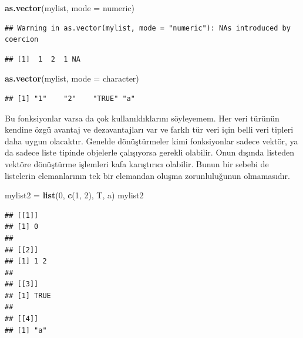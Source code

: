 \documentclass[
]{book}
\newenvironment{Shaded}{\begin{snugshade}}{\end{snugshade}}
\newcommand{\DataTypeTok}[1]{\textcolor[rgb]{0.13,0.29,0.53}{#1}}
\newcommand{\DecValTok}[1]{\textcolor[rgb]{0.00,0.00,0.81}{#1}}
\newcommand{\KeywordTok}[1]{\textcolor[rgb]{0.13,0.29,0.53}{\textbf{#1}}}
\newcommand{\NormalTok}[1]{#1}
\newcommand{\StringTok}[1]{\textcolor[rgb]{0.31,0.60,0.02}{#1}}
\begin{document}
\begin{Shaded}
\begin{Highlighting}[]
\KeywordTok{as.vector}\NormalTok{(mylist, }\DataTypeTok{mode =} \StringTok{\textquotesingle{}numeric\textquotesingle{}}\NormalTok{)}
\end{Highlighting}
\end{Shaded}

\begin{verbatim}
## Warning in as.vector(mylist, mode = "numeric"): NAs introduced by coercion
\end{verbatim}

\begin{verbatim}
## [1]  1  2  1 NA
\end{verbatim}

\begin{Shaded}
\begin{Highlighting}[]
\KeywordTok{as.vector}\NormalTok{(mylist, }\DataTypeTok{mode =} \StringTok{\textquotesingle{}character\textquotesingle{}}\NormalTok{)}
\end{Highlighting}
\end{Shaded}

\begin{verbatim}
## [1] "1"    "2"    "TRUE" "a"
\end{verbatim}

Bu fonksiyonlar varsa da çok kullanıldıklarını söyleyemem. Her veri türünün kendine özgü avantaj ve dezavantajları var ve farklı tür veri için belli veri tipleri daha uygun olacaktır. Genelde dönüştürmeler kimi fonksiyonlar sadece vektör, ya da sadece liste tipinde objelerle çalışıyorsa gerekli olabilir. Onun dışında listeden vektöre dönüştürme işlemleri kafa karıştırıcı olabilir. Bunun bir sebebi de listelerin elemanlarının tek bir elemandan oluşma zorunluluğunun olmamasıdır.

\begin{Shaded}
\begin{Highlighting}[]
\NormalTok{mylist2 =}\StringTok{ }\KeywordTok{list}\NormalTok{(}\DecValTok{0}\NormalTok{, }\KeywordTok{c}\NormalTok{(}\DecValTok{1}\NormalTok{, }\DecValTok{2}\NormalTok{), T, }\StringTok{\textquotesingle{}a\textquotesingle{}}\NormalTok{)}
\NormalTok{mylist2}
\end{Highlighting}
\end{Shaded}

\begin{verbatim}
## [[1]]
## [1] 0
## 
## [[2]]
## [1] 1 2
## 
## [[3]]
## [1] TRUE
## 
## [[4]]
## [1] "a"
\end{verbatim}
\end{document}
